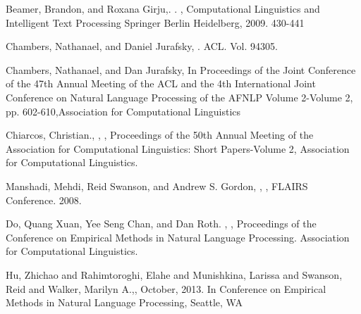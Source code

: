 \documentclass[12pt]{article}
\begin{document}
\begin{thebibliography}{}

Beamer, Brandon, and Roxana Girju,.
.
, 
\newblock Computational Linguistics and Intelligent Text Processing
\newblock Springer Berlin Heidelberg, 2009. 430-441

	   
	Chambers, Nathanael, and Daniel Jurafsky,
	.
	  ACL. Vol. 94305.

	Chambers, Nathanael, and Dan Jurafsky,
	\newblock In Proceedings of the Joint Conference of the 47th Annual Meeting of the ACL and the 4th International Joint Conference on Natural Language Processing of the AFNLP
	  \newblock Volume 2-Volume 2, pp. 602-610,Association for Computational Linguistics

	Chiarcos, Christian.,
	,
	,
	\newblock  Proceedings of the 50th Annual Meeting of the Association for Computational Linguistics: Short Papers-Volume 2,
	\newblock Association for Computational Linguistics.

	
	Manshadi, Mehdi, Reid Swanson, and Andrew S. Gordon,
	,
	,
	 \newblock FLAIRS Conference. 2008.

	Do, Quang Xuan, Yee Seng Chan, and Dan Roth.
	,
	,
	 \newblock Proceedings of the Conference on Empirical Methods in Natural Language Processing. 
	 \newblock Association for Computational Linguistics.
	 
	Hu, Zhichao and Rahimtoroghi, Elahe and Munishkina, Larissa and Swanson, Reid and Walker, Marilyn A.,,
	\newblock  October, 2013.
	\newblock In Conference on Empirical Methods in Natural Language Processing,
	\newblock Seattle, WA
	 

\end{thebibliography}
\end{document}
